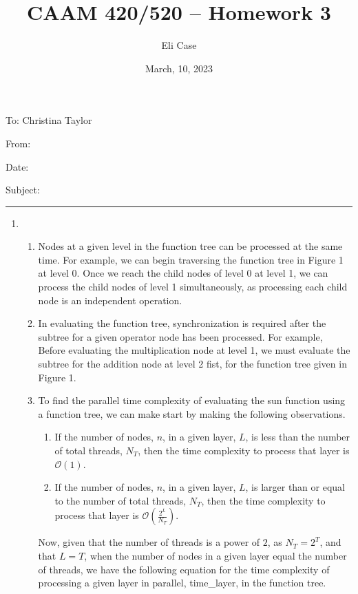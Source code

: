 \documentclass[11pt]{article}
\author{Eli Case}
\title{CAAM 420/520 -- Homework 3}
\date{March, 10, 2023}
\begin{document}
\flushleft
\thispagestyle{plain}
To: Christina Taylor

From: \@author

Date: \@date

Subject: \@title

\makeatother
\medskip
\hrule
\medskip

\begin{enumerate}[leftmargin=0.9in]
\item %

   \begin{enumerate}[leftmargin=0.3in]
       \item
           Nodes at a given level in the function tree can be processed at the same time. For example, we can begin traversing the function tree in Figure 1 at level 0. Once we reach the child nodes of level 0 at level 1, we can process the child nodes of level 1 simultaneously, as processing each child node is an independent operation.
       \item
           In evaluating the function tree, synchronization is required after the subtree for a given operator node has been processed. For example, Before evaluating the multiplication node at level 1, we must evaluate the subtree for the addition node at level 2 fist, for the function tree given in Figure 1.
       \setcounter{enumii}{3}
       \item
           To find the parallel time complexity of evaluating the sun function using a function tree, we can make start by making the following observations. 
           \begin{enumerate}
               \item If the number of nodes, $n$, in a given layer, $L$, is less than the number of total threads, $N_T$, then the time complexity to process that layer is $\mathcal{O}(1)$.
               \item If the number of nodes, $n$, in a given layer, $L$, is larger than or equal to the number of total threads, $N_T$, then the time complexity to process that layer is $\mathcal{O}(\frac{2^L}{N_T})$.
           \end{enumerate}
           Now, given that the number of threads is a power of $2$, as $N_T = 2^T$, and that $L=T$, when the number of nodes in a given layer equal the number of threads, we have the following equation for the time complexity of processing a given layer in parallel, {\selectfont time\_layer}, in the function tree.
           \begin{equation} \label{eq:1}

\end{equation}
\end{enumerate}
\end{enumerate}
\end{document}
